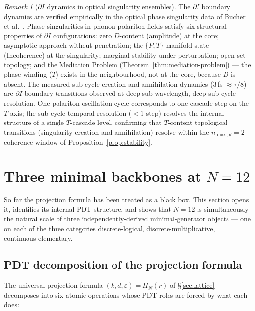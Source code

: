 \documentclass[11pt,a4paper]{article}
\theoremstyle{definition}
\theoremstyle{remark}
\newtheorem{remark}[theorem]{Remark}
\begin{document}
\begin{remark}[$\partial I$ dynamics in optical singularity ensembles]\label{rem:dI-optics}
The $\partial I$ boundary dynamics are verified empirically in the optical phase singularity data of Bucher et al.~\cite{Bucher2025}. Phase singularities in phonon-polariton fields satisfy six structural properties of $\partial I$ configurations: zero $D$-content (amplitude) at the core; asymptotic approach without penetration; the $\{P,T\}$ manifold state (Incoherence) at the singularity; marginal stability under perturbation; open-set topology; and the Mediation Problem (Theorem~\ref{thm:mediation-problem}) --- the phase winding ($T$) exists in the neighbourhood, not at the core, because $D$ is absent. The measured sub-cycle creation and annihilation dynamics ($3$\,fs $\approx \tau/8$) are $\partial I$ boundary transitions observed at deep sub-wavelength, deep sub-cycle resolution. One polariton oscillation cycle corresponds to one cascade step on the $T$-axis; the sub-cycle temporal resolution ($< 1$ step) resolves the internal structure of a single $T$-cascade level, confirming that $T$-content topological transitions (singularity creation and annihilation) resolve within the $n_{\max,\theta}=2$ coherence window of Proposition~\ref{prop:stability}.
\end{remark}

\section{Three minimal backbones at $N=12$}\label{sec:backbones}

So far the projection formula has been treated as a black box. This section opens it, identifies its internal PDT structure, and shows that $N=12$ is simultaneously the natural scale of three independently-derived minimal-generator objects --- one on each of the three categories discrete-logical, discrete-multiplicative, continuous-elementary.

\subsection{PDT decomposition of the projection formula}\label{subsec:pdt-decomp}

The universal projection formula $(k,d,\varepsilon) = \Pi_{N}(r)$ of \S\ref{sec:lattice} decomposes into six atomic operations whose PDT roles are forced by what each does:
\end{document}
